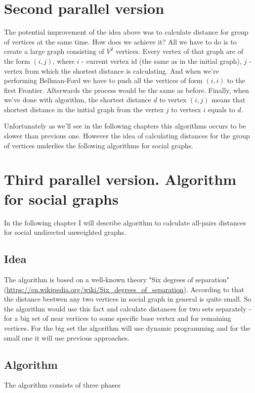 \FloatBarrier
\section{Second parallel version}

The potential improvement of the idea above was to calculate distance for group of vertices at the same time. How does we achieve it? All we have to do is to create a large graph consisting of $V^2$ vertices. Every vertex of that graph are of the form $(i, j)$, where $i$ - current vertex id (the same as in the initial graph), $j$ - vertex from which the shortest distance is calculating. And when we're performing Bellman-Ford we have to push all the vertices of form $(i, i)$ to the first Frontier. Afterwards the process would be the same as before. Finally, when we've done with algorithm, the shortest distance $d$ to vertex $(i, j)$ means that shortest distance in the initial graph from the vertex $j$ to vertesx $i$ equals to $d$.

Unfortunately as we'll see in the following chapters this algorithms occurs to be slower than previous one. However the idea of calculating distances for the group of vertices underlies the following algorithms for social graphs. 

\FloatBarrier
\section{Third parallel version. Algorithm for social graphs}
In the following chapter I will describe algorithm to calculate all-pairs distances for social undirected unweighted graphs.   

\FloatBarrier
\subsection{Idea}
The algorithm is based on a well-known theory "Six degrees of separation" (\url{https://en.wikipedia.org/wiki/Six_degrees_of_separation}). According to that the distance beetwen any two vertices in social graph in general is quite small. So the algorithm would use this fact and calculate distances for two sets separately - for a big set of near vertices to some specific base vertex and for remaining vertices. For the big set the algorithm will use dynamic programming and for the small one it will use previous approaches. 

\FloatBarrier
\subsection{Algorithm}
The algorithm consists of three phases

